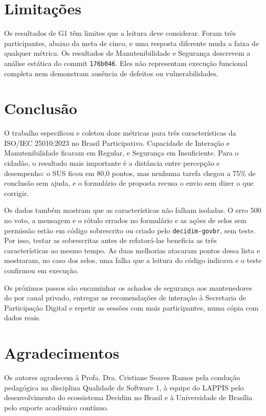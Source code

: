\documentclass[journal]{IEEEtran}
\begin{document}
\section{Limitações}
\label{sec:limitacoes}

Os resultados de G1 têm limites que a leitura deve considerar. Foram três participantes, abaixo da meta de cinco, e uma resposta diferente muda a faixa de qualquer métrica. Os resultados de Manutenibilidade e Segurança descrevem a análise estática do commit \texttt{176b046}. Eles não representam execução funcional completa nem demonstram ausência de defeitos ou vulnerabilidades.

\section{Conclusão}
\label{sec:conclusao}

O trabalho especificou e coletou doze métricas para três características da ISO/IEC 25010:2023 no Brasil Participativo. Capacidade de Interação e Manutenibilidade ficaram em Regular, e Segurança em Insuficiente. Para o cidadão, o resultado mais importante é a distância entre percepção e desempenho: o SUS ficou em 80,0 pontos, mas nenhuma tarefa chegou a 75\% de conclusão sem ajuda, e o formulário de proposta recusa o envio sem dizer o que corrigir.

Os dados também mostram que as características não falham isoladas. O erro 500 no voto, a mensagem e o rótulo errados no formulário e as ações de selos sem permissão estão em código sobrescrito ou criado pelo \texttt{decidim-govbr}, sem teste. Por isso, testar as sobrescritas antes de refatorá-las beneficia as três características ao mesmo tempo. As duas melhorias atacaram pontos dessa lista e mostraram, no caso dos selos, uma falha que a leitura do código indicava e o teste confirmou em execução.

Os próximos passos são encaminhar os achados de segurança aos mantenedores do  por canal privado, entregar as recomendações de interação à Secretaria de Participação Digital e repetir as sessões com mais participantes, numa cópia com dados reais.

\section*{Agradecimentos}

Os autores agradecem à Profa. Dra. Cristiane Soares Ramos pela condução pedagógica na disciplina Qualidade de Software 1, à equipe do LAPPIS pelo desenvolvimento do ecossistema Decidim no Brasil e à Universidade de Brasília pelo suporte acadêmico contínuo.
\end{document}
